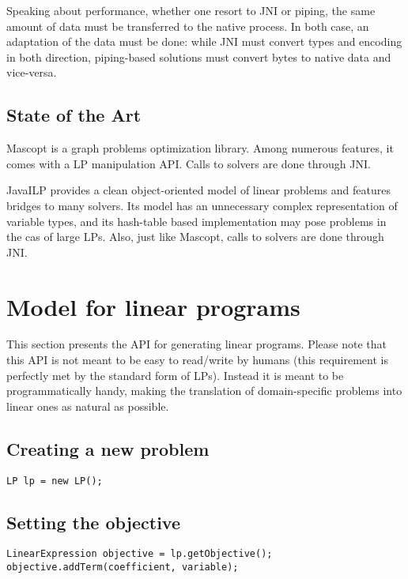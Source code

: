 \documentclass{article}
\begin{document}
Speaking about performance, whether one resort to JNI or piping, the same amount of data must be transferred to
the native process. In both case, an adaptation of the data must be done: while JNI must convert types and encoding in both direction, piping-based solutions
must convert bytes to native data and vice-versa.
 
 
 
\subsection{State of the Art}

Mascopt is a graph problems optimization library. Among numerous features, it comes with  a LP manipulation API.
Calls to solvers are done through JNI. 

JavaILP provides a clean object-oriented model of linear problems and features bridges to
many solvers. Its model has an unnecessary complex representation of variable types, and its hash-table based implementation may pose problems in the cas of large LPs.
Also, just like Mascopt, calls to solvers are done through JNI. 




\section{Model for linear programs}

This section presents the API for generating linear programs.
Please note that this API is not meant to be easy to read/write by humans (this requirement is perfectly met
by the standard form of LPs). Instead it is meant to be programmatically handy, making the translation of  domain-specific problems
into linear ones as natural as possible.


\subsection{Creating a new problem}


\begin{lstlisting}
LP lp = new LP();
\end{lstlisting}

\subsection{Setting the objective}

\begin{lstlisting}
LinearExpression objective = lp.getObjective();
objective.addTerm(coefficient, variable);
\end{lstlisting}
\end{document}
